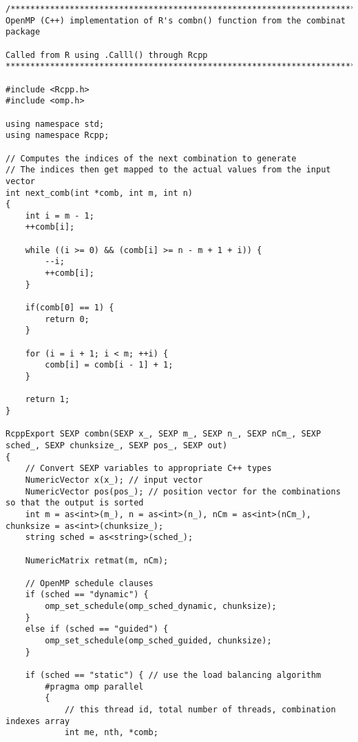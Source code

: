 {

\begin{lstlisting}
/****************************************************************************
OpenMP (C++) implementation of R's combn() function from the combinat package

Called from R using .Calll() through Rcpp
*****************************************************************************/

#include <Rcpp.h>
#include <omp.h>

using namespace std;
using namespace Rcpp;

// Computes the indices of the next combination to generate 
// The indices then get mapped to the actual values from the input vector
int next_comb(int *comb, int m, int n)
{
	int i = m - 1;	
	++comb[i];
		
	while ((i >= 0) && (comb[i] >= n - m + 1 + i)) {		
		--i;		
		++comb[i];	
	}
		
	if(comb[0] == 1) {
		return 0;
	}
		
	for (i = i + 1; i < m; ++i) {
		comb[i] = comb[i - 1] + 1;		
	}
	
	return 1;
}

RcppExport SEXP combn(SEXP x_, SEXP m_, SEXP n_, SEXP nCm_, SEXP sched_, SEXP chunksize_, SEXP pos_, SEXP out)
{
	// Convert SEXP variables to appropriate C++ types
	NumericVector x(x_); // input vector
	NumericVector pos(pos_); // position vector for the combinations so that the output is sorted
	int m = as<int>(m_), n = as<int>(n_), nCm = as<int>(nCm_), chunksize = as<int>(chunksize_);
	string sched = as<string>(sched_);

	NumericMatrix retmat(m, nCm);
	
	// OpenMP schedule clauses
	if (sched == "dynamic") {
		omp_set_schedule(omp_sched_dynamic, chunksize);
	}
	else if (sched == "guided") {
		omp_set_schedule(omp_sched_guided, chunksize);
	}

	if (sched == "static") { // use the load balancing algorithm
		#pragma omp parallel
		{
			// this thread id, total number of threads, combination indexes array
			int me, nth, *comb;


\end{lstlisting}}
